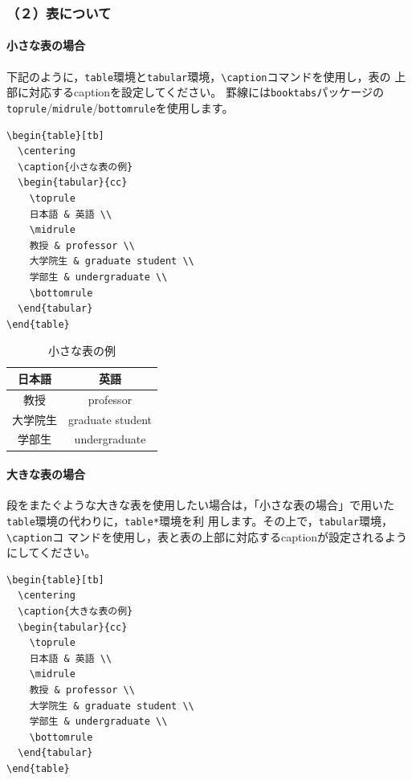 \documentclass[b5paper,10pt,twocolumn,tombow]{jarticle}
\begin{document}
\subsubsection*{（２）表について}
\paragraph*{小さな表の場合}
下記のように，\texttt{table}環境と\texttt{tabular}環境，\verb|\caption|コマンドを使用し，表の
上部に対応するcaptionを設定してください。
罫線には\texttt{booktabs}パッケージの\texttt{toprule}/\texttt{midrule}/\texttt{bottomrule}を使用します。

\begin{verbatim}
\begin{table}[tb]
  \centering
  \caption{小さな表の例}
  \begin{tabular}{cc}
    \toprule
    日本語 & 英語 \\
    \midrule
    教授 & professor \\
    大学院生 & graduate student \\
    学部生 & undergraduate \\
    \bottomrule
  \end{tabular}
\end{table}
\end{verbatim}

\begin{table}[tb]
  \centering
  \caption{小さな表の例}
  \begin{tabular}{cc}
    \toprule
    日本語 & 英語 \\
    \midrule
    教授 & professor \\
    大学院生 & graduate student \\
    学部生 & undergraduate \\
    \bottomrule
  \end{tabular}
\end{table}

\paragraph*{大きな表の場合}
段をまたぐような大きな表を使用したい場合は，「小さな表の場合」で用いた
\texttt{table}環境の代わりに，\texttt{table*}環境を利
用します。その上で，\texttt{tabular}環境，\verb|\caption|コ
マンドを使用し，表と表の上部に対応するcaptionが設定されるようにしてください。

\begin{verbatim}
\begin{table}[tb]
  \centering
  \caption{大きな表の例}
  \begin{tabular}{cc}
    \toprule
    日本語 & 英語 \\
    \midrule
    教授 & professor \\
    大学院生 & graduate student \\
    学部生 & undergraduate \\
    \bottomrule
  \end{tabular}
\end{table}
\end{verbatim}
\end{document}
